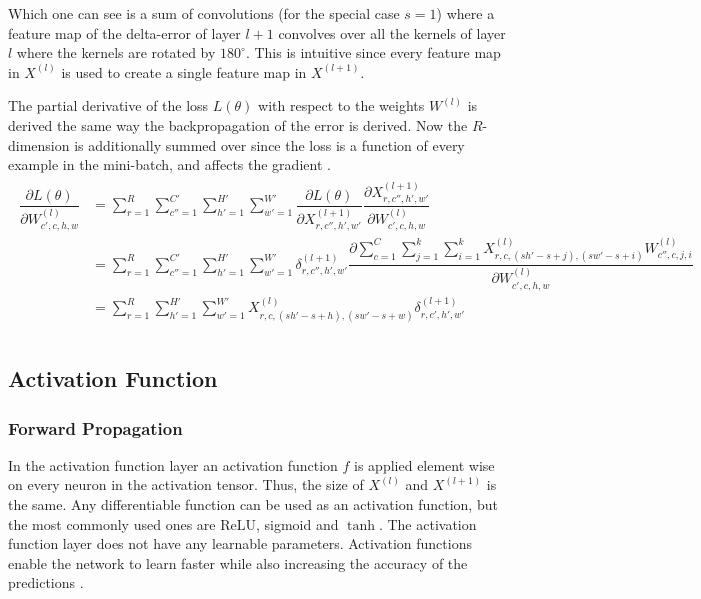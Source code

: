 \documentclass[a4paper, twoside]{article}
\newcommand*{\pd}[2]{\ensuremath{\dfrac{\partial #1}{\partial #2}}}
\begin{document}
Which one can see is a sum of convolutions (for the special case $s=1$) where a feature map of the delta-error of layer $l+1$ convolves over all the kernels of layer $l$ where the kernels are rotated by $180^\circ$. This is intuitive since every feature map in $X^{(l)}$ is used to create a single feature map in $X^{(l+1)}$.

The partial derivative of the loss $L(\theta)$ with respect to the weights $W^{(l)}$ is derived the same way the backpropagation of the error is derived. Now the $R$-dimension is additionally summed over since the loss is a function of every example in the mini-batch, and affects the gradient \cite{cs231n} \cite{webconv1} \cite{webconv2} \cite{webconv3}. 
\begin{align}
\begin{split}
	\pd{L(\theta)}{W^{(l)}_{c',c,h,w}}
		& = \sum^{R }_{r=1} \sum^{C' }_{c''=1} \sum^{H' }_{h'=1} \sum^{W' }_{w'=1} \pd{L(\theta)}{X^{(l+1)}_{r,c'',h',w'}} \pd{X^{(l+1)}_{r,c'',h',w'}}{W^{(l)}_{c',c,h,w}} \\
		& = \sum^{R }_{r=1} \sum_{c''=1}^{C' } \sum^{H' }_{h'=1} \sum^{W' }_{w'=1} \delta^{(l+1)}_{r,c'',h',w'} \pd{\sum\limits^{C }_{c=1} \sum\limits^{k }_{j=1} \sum\limits^{k}_{i=1} X^{(l)}_{r, c, (sh'-s+j), (sw'-s+i)}W^{(l)}_{c'', c, j, i}}{W^{(l)}_{c',c,h,w}} \\
		& = \sum^{R }_{r=1} \sum^{H' }_{h'=1} \sum^{W' }_{w'=1} X^{(l)}_{r, c, (sh'-s+h), (sw'-s+w)} \delta^{(l+1)}_{r,c',h',w'} \\
\end{split}
\end{align}

\subsection{Activation Function}
\subsubsection{Forward Propagation}
In the activation function layer an activation function $f$ is applied element wise on every neuron in the activation tensor. Thus, the size of $X^{(l)}$ and $X^{(l+1)}$ is the same. Any differentiable function can be used as an activation function, but the most commonly used ones are ReLU, sigmoid and $\tanh$. The activation function layer does not have any learnable parameters. Activation functions enable the network to learn faster while also increasing the accuracy of the predictions \cite{cs231n} \cite{convmath}. 
 
\end{document}
